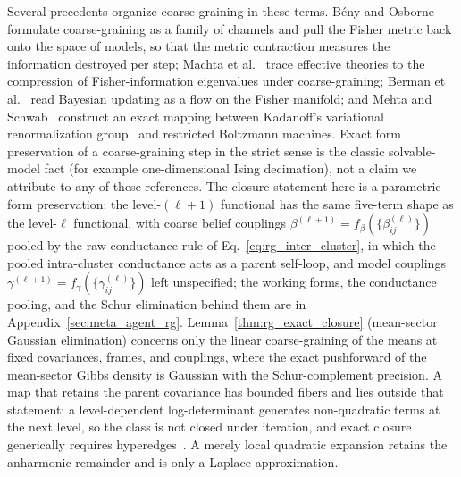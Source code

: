 \documentclass[11pt]{article}
\begin{document}
Several precedents organize coarse-graining in these terms. B\'eny and Osborne~\cite{beny2015information} formulate coarse-graining as a family of channels and pull the Fisher metric back onto the space of models, so that the metric contraction measures the information destroyed per step; Machta et al.~\cite{Machta2013} trace effective theories to the compression of Fisher-information eigenvalues under coarse-graining; Berman et al.~\cite{BermanKlingerStapleton2023} read Bayesian updating as a flow on the Fisher manifold; and Mehta and Schwab~\cite{mehta2014exact} construct an exact mapping between Kadanoff's variational renormalization group~\cite{Kadanoff1975, KadanoffHoughtonYalabik1976} and restricted Boltzmann machines. Exact form preservation of a coarse-graining step in the strict sense is the classic solvable-model fact (for example one-dimensional Ising decimation), not a claim we attribute to any of these references. The closure statement here is a parametric form preservation: the level-$(\ell+1)$ functional has the same five-term shape as the level-$\ell$ functional, with coarse belief couplings $\beta^{(\ell+1)} = f_\beta(\{\beta_{ij}^{(\ell)}\})$ pooled by the raw-conductance rule of Eq.~\eqref{eq:rg_inter_cluster}, in which the pooled intra-cluster conductance acts as a parent self-loop, and model couplings $\gamma^{(\ell+1)} = f_\gamma(\{\gamma_{ij}^{(\ell)}\})$ left unspecified; the working forms, the conductance pooling, and the Schur elimination behind them are in Appendix~\ref{sec:meta_agent_rg}. Lemma~\ref{thm:rg_exact_closure} (mean-sector Gaussian elimination) concerns only the linear coarse-graining of the means at fixed covariances, frames, and couplings, where the exact pushforward of the mean-sector Gibbs density is Gaussian with the Schur-complement precision. A map that retains the parent covariance has bounded fibers and lies outside that statement; a level-dependent log-determinant generates non-quadratic terms at the next level, so the class is not closed under iteration, and exact closure generically requires hyperedges~\cite[Ch.~11, the hyperedge-generation proposition]{DennisGaugeVFE2026}. A merely local quadratic expansion retains the anharmonic remainder and is only a Laplace approximation.
\end{document}
